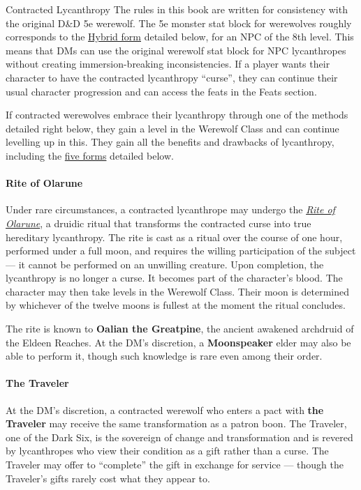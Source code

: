 \documentclass[twocolumn]{dndbook}
\begin{document}
\begin{DndSidebar}[float=!b]{Contracted Lycanthropy}
    The rules in this book are written for consistency with the original D\&D 5e werewolf.
    The 5e monster stat block for werewolves roughly corresponds to the \hyperref[sec:hybrid-form]{Hybrid form} detailed below, for an NPC of the 8th level.
    This means that DMs can use the original werewolf stat block for NPC lycanthropes without creating immersion-breaking inconsistencies.
    If a player wants their character to have the contracted lycanthropy ``curse'', they can continue their usual character progression and can access the feats in the Feats section.
\end{DndSidebar}

If contracted werewolves embrace their lycanthropy through one of the methods detailed right below, they gain a level in the Werewolf Class and can continue levelling up in this.
They gain all the benefits and drawbacks of lycanthropy, including the \hyperref[sec:the-forms]{five forms} detailed below.\par

\paragraph*{Rite of Olarune}
Under rare circumstances, a contracted lycanthrope may undergo the \hyperref[spell:rite-of-olarune]{\emph{Rite of Olarune}}, a druidic ritual that transforms the contracted curse into true hereditary lycanthropy.
The rite is cast as a ritual over the course of one hour, performed under a full moon, and requires the willing participation of the subject --- it cannot be performed on an unwilling creature.
Upon completion, the lycanthropy is no longer a curse.
It becomes part of the character's blood.
The character may then take levels in the Werewolf Class.
Their moon is determined by whichever of the twelve moons is fullest at the moment the ritual concludes.\par

The rite is known to \textbf{Oalian the Greatpine}, the ancient awakened archdruid of the Eldeen Reaches.
At the DM's discretion, a \textbf{Moonspeaker} elder may also be able to perform it, though such knowledge is rare even among their order.\par

\paragraph*{The Traveler}\label{par:the-traveler}
At the DM's discretion, a contracted werewolf who enters a pact with \textbf{the Traveler} may receive the same transformation as a patron boon.
The Traveler, one of the Dark Six, is the sovereign of change and transformation and is revered by lycanthropes who view their condition as a gift rather than a curse.
The Traveler may offer to ``complete'' the gift in exchange for service --- though the Traveler's gifts rarely cost what they appear to.\par
\end{document}
